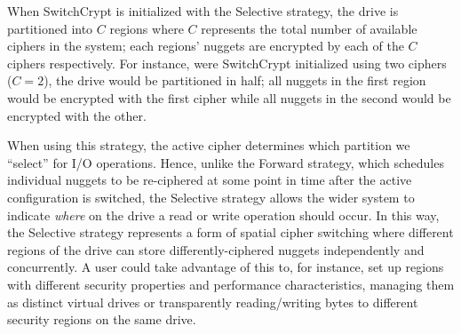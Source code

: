 


When SwitchCrypt is initialized with the
Selective strategy, the drive is partitioned into $C$ regions where $C$
represents the total number of available ciphers in the system; each regions'
nuggets are encrypted by each of the $C$ ciphers respectively. For instance,
were SwitchCrypt initialized using two ciphers ($C = 2$), the drive would be
partitioned in half; all nuggets in the first region would be encrypted with the
first cipher while all nuggets in the second would be encrypted with the other.

When using this strategy, the active cipher determines which partition we
``select'' for I/O operations. Hence, unlike the Forward strategy, which
schedules individual nuggets to be re-ciphered at some point in time after the
active configuration is switched, the Selective strategy allows the wider system
to indicate \emph{where} on the drive a read or write operation should occur. In
this way, the Selective strategy represents a form of spatial cipher switching
where different regions of the drive can store differently-ciphered nuggets
independently and concurrently. A user could take advantage of this to, for
instance, set up regions with different security properties and performance
characteristics, managing them as distinct virtual drives or transparently
reading/writing bytes to different security regions on the same drive.


